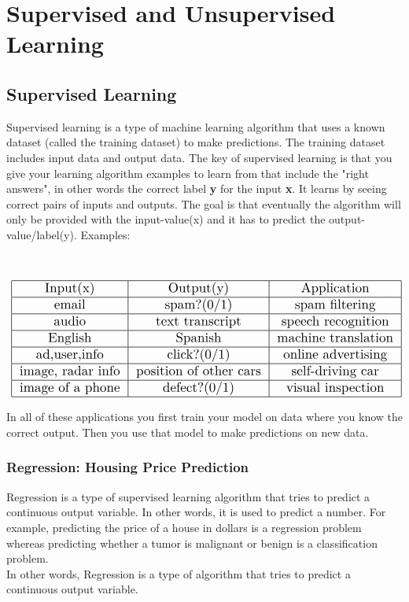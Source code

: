 \section{Supervised and Unsupervised Learning}

\subsection{Supervised Learning}
Supervised learning is a type of machine learning algorithm that uses a known dataset (called the training dataset) to make predictions. The training dataset includes input data and output data. The key of supervised learning is that you give your learning algorithm examples to learn from that include the "right answers", in other words the correct label \textbf{y} for the input \textbf{x}.
It learns by seeing correct pairs of inputs and outputs.  The goal is that eventually the algorithm will only be provided with the input-value(x) and it has to predict the output-value/label(y). 
Examples: \\ \\ \\

\begin{align*}
    \scalebox{1.3}{
\begin{tabular}{|c|c|c|}
    \hline
    Input(x) & Output(y) & Application \\
    \hline
    email & spam?(0/1) & spam filtering \\
    \hline
    audio & text transcript & speech recognition \\
    \hline
    English & Spanish & machine translation \\
    \hline
    ad,user,info & click?(0/1) & online advertising \\
    \hline
    image, radar info & position of other cars & self-driving car \\
    \hline
    image of a phone & defect?(0/1) & visual inspection \\
    \hline
\end{tabular}}
\end{align*}

In all of these applications you first train your model on data where you know the correct output. Then you use that model to make predictions on new data. \\

\subsubsection*{Regression: Housing Price Prediction}
Regression is a type of supervised learning algorithm that tries to predict a continuous output variable. In other words, it is used to predict a number. For example, predicting the price of a house in dollars is a regression problem whereas predicting whether a tumor is malignant or benign is a classification problem. \\
In other words, Regression is a type of algorithm that tries to predict a continuous output variable. 


